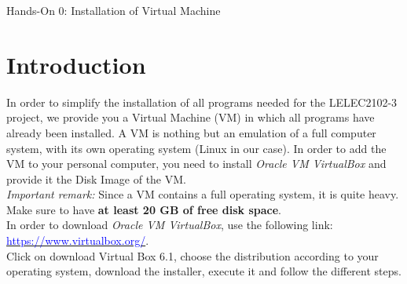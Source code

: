 \documentclass[a4paper,11pt]{article}
\newcommand\handsOnN{0}
\begin{document}
\renewcommand{\figurename}{Fig.}

\renewcommand{\thepage}{\arabic{page}}
\setcounter{page}{1}
\pagestyle{main}
\newpage \clearpage

\begin{center}
\begin{huge}
Hands-On \handsOnN: Installation of Virtual Machine\\
\end{huge}
\vspace{0.3cm}
\end{center}
\section{Introduction}
In order to simplify the installation of all programs needed for the LELEC2102-3 project, we provide you a Virtual Machine (VM) in which all programs have already been installed. A VM is nothing but an emulation of a full computer system, with its own operating system (Linux in our case). In order to add the VM to your personal computer, you need to install \textit{Oracle VM VirtualBox} and provide it the Disk Image of the VM.\\

\textit{Important remark:} Since a VM contains a full operating system, it is quite heavy. Make sure to have \textbf{at least 20 GB of free disk space}.\\

In order to download \textit{Oracle VM VirtualBox}, use the following link: \href{https://www.virtualbox.org/}{\textcolor{blue}{https://www.virtualbox.org/}}.\\
Click on download Virtual Box 6.1, choose the distribution according to your operating system, download the installer, execute it and follow the different steps.
\end{document}

